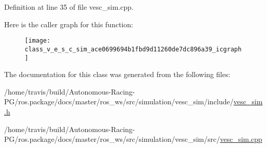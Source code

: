 Definition at line 35 of file vesc\+\_\+sim.\+cpp.



Here is the caller graph for this function\+:
\nopagebreak
\begin{figure}[H]
\begin{center}
\leavevmode
\texttt{[image: class\_v\_e\_s\_c\_sim\_ace0699694b1fbd9d11260de7dc896a39\_icgraph]}
\end{center}
\end{figure}




The documentation for this class was generated from the following files\+:\begin{DoxyCompactItemize}
\item 
/home/travis/build/\+Autonomous-\/\+Racing-\/\+P\+G/ros.\+package/docs/master/ros\+\_\+ws/src/simulation/vesc\+\_\+sim/include/\hyperlink{vesc__sim_8h}{vesc\+\_\+sim.\+h}\item 
/home/travis/build/\+Autonomous-\/\+Racing-\/\+P\+G/ros.\+package/docs/master/ros\+\_\+ws/src/simulation/vesc\+\_\+sim/src/\hyperlink{vesc__sim_8cpp}{vesc\+\_\+sim.\+cpp}\end{DoxyCompactItemize}
